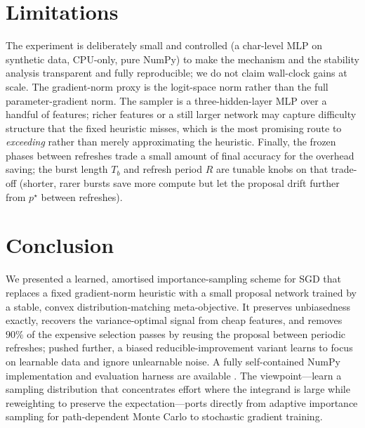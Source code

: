 \documentclass[11pt]{article}
\begin{document}
\section{Limitations}
The experiment is deliberately small and controlled (a char-level MLP on
synthetic data, CPU-only, pure NumPy) to make the mechanism and the
stability analysis transparent and fully reproducible; we do not claim
wall-clock gains at scale. The gradient-norm proxy is the logit-space norm rather
than the full parameter-gradient norm. The sampler is a three-hidden-layer MLP
over a handful of features; richer features or a still larger network may capture
difficulty structure that the fixed heuristic misses, which is the most promising
route to \emph{exceeding} rather than merely approximating the heuristic. Finally, the
frozen phases between refreshes trade a small amount of final accuracy for the
overhead saving; the burst length $T_b$ and refresh period $R$ are tunable knobs
on that trade-off (shorter, rarer bursts save more compute but let the proposal
drift further from $p^\star$ between refreshes).

\section{Conclusion}
We presented a learned, amortised importance-sampling scheme for SGD that
replaces a fixed gradient-norm heuristic with a small proposal network trained by
a stable, convex distribution-matching meta-objective. It preserves unbiasedness
exactly, recovers the variance-optimal signal from cheap features, and removes
$90\%$ of the expensive selection passes by reusing the proposal between periodic
refreshes; pushed further, a biased reducible-improvement variant learns to focus
on learnable data and ignore unlearnable noise. A fully self-contained NumPy
implementation and evaluation harness are available \citep{thiscode}.
The viewpoint---learn a sampling distribution that concentrates effort where the
integrand is large while reweighting to preserve the expectation---ports directly
from adaptive importance sampling for path-dependent Monte Carlo
\citep{virrion2020} to stochastic gradient training.
\end{document}
